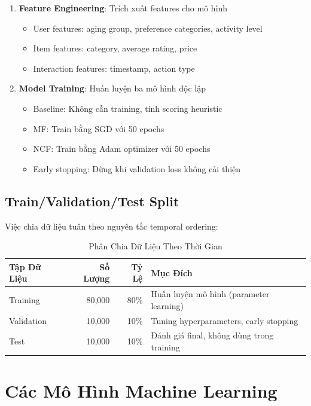 \documentclass[12pt,a4paper]{article}
\begin{document}
\begin{enumerate}
    \item \textbf{Feature Engineering}: Trích xuất features cho mô hình
    \begin{itemize}
        \item User features: aging group, preference categories, activity level
        \item Item features: category, average rating, price
        \item Interaction features: timestamp, action type
    \end{itemize}
    
    \item \textbf{Model Training}: Huấn luyện ba mô hình độc lập
    \begin{itemize}
        \item Baseline: Không cần training, tính scoring heuristic
        \item MF: Train bằng SGD với 50 epochs
        \item NCF: Train bằng Adam optimizer với 50 epochs
        \item Early stopping: Dừng khi validation loss không cải thiện
    \end{itemize}
\end{enumerate}

\subsection{Train/Validation/Test Split}

Việc chia dữ liệu tuân theo nguyên tắc temporal ordering:

\begin{table}[H]
\centering
\begin{tabular}{|l|r|r|l|}
\hline
\textbf{Tập Dữ Liệu} & \textbf{Số Lượng} & \textbf{Tỷ Lệ} & \textbf{Mục Đích} \\
\hline
Training & 80,000 & 80\% & Huấn luyện mô hình (parameter learning) \\
Validation & 10,000 & 10\% & Tuning hyperparameters, early stopping \\
Test & 10,000 & 10\% & Đánh giá final, không dùng trong training \\
\hline
\end{tabular}
\caption{Phân Chia Dữ Liệu Theo Thời Gian}
\end{table}

\section{Các Mô Hình Machine Learning}
\end{document}
